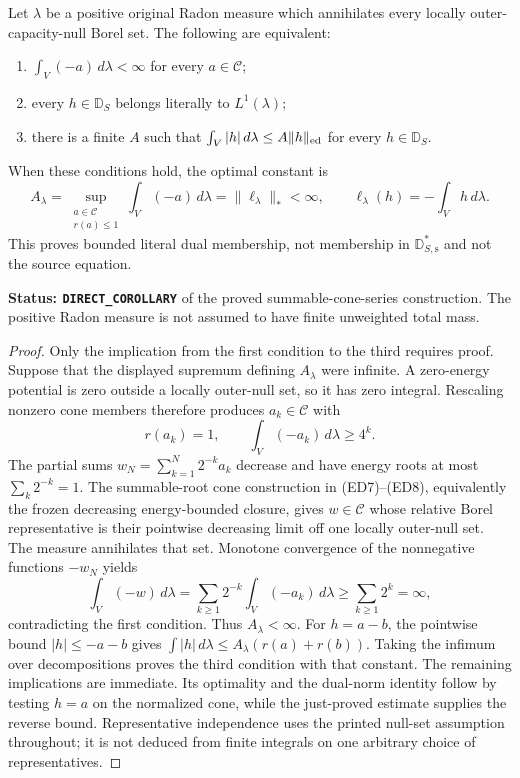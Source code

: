 \begin{proposition}
\label{prop:r12-pointwise-finite-literal-dual}
Let $\lambda$ be a positive original Radon measure which
annihilates every locally outer-capacity-null Borel set. The
following are equivalent:
\begin{enumerate}
\item $\int_V(-a)\,d\lambda<\infty$ for every $a\in\mathscr C$;
\item every $h\in\mathbb D_S$ belongs literally to $L^1(\lambda)$;
\item there is a finite $A$ such that
$\int_V|h|\,d\lambda\leq A\|h\|_{\rm ed}$ for every
$h\in\mathbb D_S$.
\end{enumerate}
When these conditions hold, the optimal constant is
\[
 A_\lambda
   =\sup_{\substack{a\in\mathscr C\\r(a)\leq1}}
                  \int_V(-a)\,d\lambda
   =\|\ell_\lambda\|_*<\infty,
 \qquad \ell_\lambda(h)=-\int_Vh\,d\lambda.
 \tag{FD13}
\]
This proves bounded literal dual membership, not membership
in $\mathbb D_{S,\mathrm s}^*$ and not the source equation.
\end{proposition}

\noindent\textbf{Status: \texttt{DIRECT\_COROLLARY}} of the
proved summable-cone-series construction. The positive Radon
measure is not assumed to have finite unweighted total mass.

\begin{proof}
Only the implication from the first condition to the third
requires proof. Suppose that the displayed supremum defining
$A_\lambda$ were infinite. A zero-energy potential is zero
outside a locally outer-null set, so it has zero integral.
Rescaling nonzero cone members therefore produces $a_k\in
\mathscr C$ with
\[
                r(a_k)=1,\qquad
                \int_V(-a_k)\,d\lambda\geq4^k.
\]
The partial sums $w_N=\sum_{k=1}^N2^{-k}a_k$ decrease
and have energy roots at most $\sum_k2^{-k}=1$. The
summable-root cone construction in \textup{(ED7)--(ED8)},
equivalently the frozen decreasing energy-bounded closure,
gives $w\in\mathscr C$ whose relative Borel representative
is their pointwise decreasing limit off one locally outer-null
set. The measure annihilates that set. Monotone convergence
of the nonnegative functions $-w_N$ yields
\[
          \int_V(-w)\,d\lambda
              =\sum_{k\geq1}2^{-k}
                         \int_V(-a_k)\,d\lambda
              \geq\sum_{k\geq1}2^k=\infty,
\]
contradicting the first condition. Thus $A_\lambda<\infty$.
For $h=a-b$, the pointwise bound $|h|\leq-a-b$ gives
$\int|h|\,d\lambda\leq A_\lambda(r(a)+r(b))$.
Taking the infimum over decompositions proves the third
condition with that constant. The remaining implications
are immediate. Its optimality and the dual-norm identity
follow by testing $h=a$ on the normalized cone, while
the just-proved estimate supplies the reverse bound.
Representative independence uses the printed null-set
assumption throughout; it is not deduced from finite
integrals on one arbitrary choice of representatives.
\end{proof}

